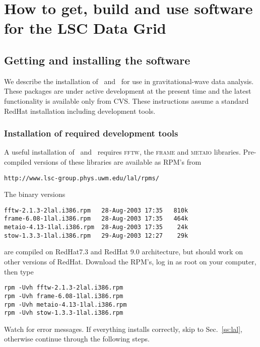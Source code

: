 %
%
\color{black}
\chapter{How to get, build and use software for the LSC Data Grid} 
\section{Getting and installing the software}

We describe the installation of \lal\ and \lalapps\ for use in
gravitational-wave data analysis.   These packages are under active
development at the present time and the latest functionality is
available only from CVS.   These instructions assume a standard
RedHat installation including development tools.   

\subsection{Installation of required development tools}

A useful installation of \lal\ and \lalapps\ requires \textsc{fftw},
the \textsc{frame} and \textsc{metaio} libraries.   Pre-compiled
versions of these libraries are available as RPM's from
\begin{verbatim}
http://www.lsc-group.phys.uwm.edu/lal/rpms/
\end{verbatim}
The binary versions
\begin{verbatim}
fftw-2.1.3-2lal.i386.rpm   28-Aug-2003 17:35   810k  
frame-6.08-1lal.i386.rpm   28-Aug-2003 17:35   464k  
metaio-4.13-1lal.i386.rpm  28-Aug-2003 17:35    24k  
stow-1.3.3-1lal.i386.rpm   29-Aug-2003 12:27    29k 
\end{verbatim}
are compiled on RedHat7.3 and RedHat 9.0 architecture,  but should work on other
versions of RedHat.   Download the RPM's,  log in as root on your
computer,  then type
\begin{verbatim}
rpm -Uvh fftw-2.1.3-2lal.i386.rpm
rpm -Uvh frame-6.08-1lal.i386.rpm
rpm -Uvh metaio-4.13-1lal.i386.rpm
rpm -Uvh stow-1.3.3-1lal.i386.rpm
\end{verbatim}
Watch for error messages.   If everything installs correctly,  skip to
Sec.~\ref{ss:lal},  otherwise continue through the following steps.  

